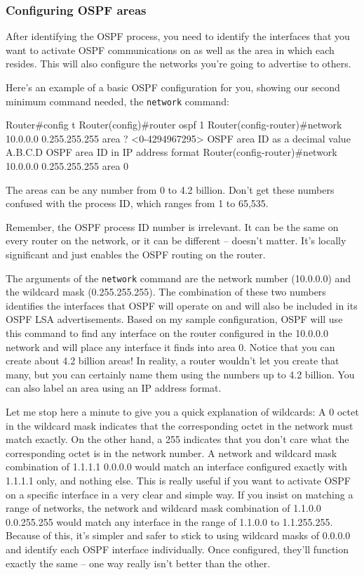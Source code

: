 \subsubsection{Configuring OSPF areas}

After identifying the OSPF process, you need to identify the interfaces
that you want to activate OSPF communications on as well as the area in
which each resides. This will also configure the networks you're going
to advertise to others.

Here's an example of a basic OSPF configuration for you, showing our
second minimum command needed, the \texttt{network} command:

\begin{cli}
Router#config t
Router(config)#router ospf 1
Router(config-router)#network 10.0.0.0 0.255.255.255 area ?
  <0-4294967295>  OSPF area ID as a decimal value
  A.B.C.D         OSPF area ID in IP address format
Router(config-router)#network 10.0.0.0 0.255.255.255 area 0
\end{cli}

\begin{note}
The areas can be any number from 0 to 4.2 billion.
Don't get these numbers confused with the process ID, which ranges from 1 to 65,535.
\end{note}

Remember, the OSPF process ID number is irrelevant. It can be the same
on every router on the network, or it can be different -- doesn't matter.
It's locally significant and just enables the OSPF routing on the
router.

The arguments of the \texttt{network} command are the network number
(10.0.0.0) and the wildcard mask (0.255.255.255). The combination of
these two numbers identifies the interfaces that OSPF will operate on
and will also be included in its OSPF LSA advertisements. Based on my
sample configuration, OSPF will use this command to find any interface
on the router configured in the 10.0.0.0 network and will place any
interface it finds into area 0.
\protect\hypertarget{c18.xhtmlux5cux23Page_755}{}{}Notice that you can
create about 4.2 billion areas! In reality, a router wouldn't let you
create that many, but you can certainly name them using the numbers up
to 4.2 billion. You can also label an area using an IP address format.

Let me stop here a minute to give you a quick explanation of wildcards:
A 0 octet in the wildcard mask indicates that the corresponding octet in
the network must match exactly. On the other hand, a 255 indicates that
you don't care what the corresponding octet is in the network number. A
network and wildcard mask combination of 1.1.1.1 0.0.0.0 would match an
interface configured exactly with 1.1.1.1 only, and nothing else. This
is really useful if you want to activate OSPF on a specific interface in
a very clear and simple way. If you insist on matching a range of
networks, the network and wildcard mask combination of 1.1.0.0
0.0.255.255 would match any interface in the range of 1.1.0.0 to
1.1.255.255. Because of this, it's simpler and safer to stick to using
wildcard masks of 0.0.0.0 and identify each OSPF interface individually.
Once configured, they'll function exactly the same -- one way really
isn't better than the other.

